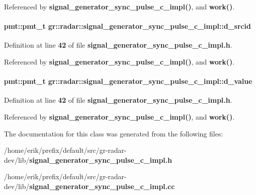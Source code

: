 Referenced by {\bf signal\+\_\+generator\+\_\+sync\+\_\+pulse\+\_\+c\+\_\+impl()}, and {\bf work()}.

\paragraph[{d\+\_\+srcid}]{\setlength{\rightskip}{0pt plus 5cm}pmt\+::pmt\+\_\+t gr\+::radar\+::signal\+\_\+generator\+\_\+sync\+\_\+pulse\+\_\+c\+\_\+impl\+::d\+\_\+srcid}\label{classgr_1_1radar_1_1signal__generator__sync__pulse__c__impl_abf9a613f5f5870970a644a3f7ac9d0aa}


Definition at line {\bf 42} of file {\bf signal\+\_\+generator\+\_\+sync\+\_\+pulse\+\_\+c\+\_\+impl.\+h}.



Referenced by {\bf signal\+\_\+generator\+\_\+sync\+\_\+pulse\+\_\+c\+\_\+impl()}, and {\bf work()}.

\paragraph[{d\+\_\+value}]{\setlength{\rightskip}{0pt plus 5cm}pmt\+::pmt\+\_\+t gr\+::radar\+::signal\+\_\+generator\+\_\+sync\+\_\+pulse\+\_\+c\+\_\+impl\+::d\+\_\+value}\label{classgr_1_1radar_1_1signal__generator__sync__pulse__c__impl_afe57fa0a58ca71ff6cb378a7c0aa109b}


Definition at line {\bf 42} of file {\bf signal\+\_\+generator\+\_\+sync\+\_\+pulse\+\_\+c\+\_\+impl.\+h}.



Referenced by {\bf signal\+\_\+generator\+\_\+sync\+\_\+pulse\+\_\+c\+\_\+impl()}, and {\bf work()}.



The documentation for this class was generated from the following files\+:\begin{DoxyCompactItemize}
\item 
/home/erik/prefix/default/src/gr-\/radar-\/dev/lib/{\bf signal\+\_\+generator\+\_\+sync\+\_\+pulse\+\_\+c\+\_\+impl.\+h}\item 
/home/erik/prefix/default/src/gr-\/radar-\/dev/lib/{\bf signal\+\_\+generator\+\_\+sync\+\_\+pulse\+\_\+c\+\_\+impl.\+cc}\end{DoxyCompactItemize}
